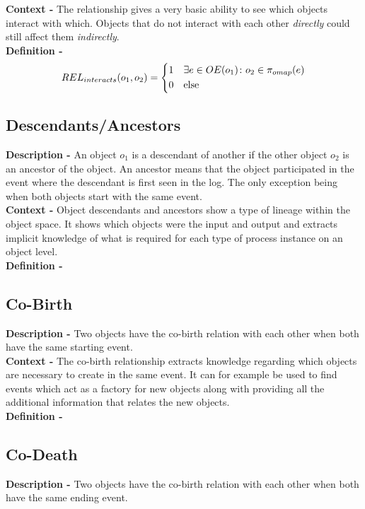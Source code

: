 \documentclass{article}
\begin{document}
\noindent\textbf{Context -} The relationship gives a very basic ability to see which objects interact with which. Objects that do not interact with each other \emph{directly} could still affect them \emph{indirectly}. \\

\noindent\textbf{Definition -}
\begin{equation}
	REL_{interacts}(o_1, o_2) =
	\begin{cases*}
		1 & $\exists e \in OE(o_1) \colon o_2 \in \pi_{omap}(e)$\\
		0 & else
	\end{cases*}
\end{equation}
\subsection{Descendants/Ancestors}
\noindent\textbf{Description -} An object $o_1$ is a descendant of another if the other object $o_2$ is an ancestor of the object. An ancestor means that the object participated in the event where the descendant is first seen in the log. The only exception being when both objects start with the same event. \\

\noindent\textbf{Context -} Object descendants and ancestors show a type of lineage within the object space. It shows which objects were the input and output and extracts implicit knowledge of what is required for each type of process instance on an object level. \\

\noindent\textbf{Definition -}
\subsection{Co-Birth}
\noindent\textbf{Description -} Two objects have the co-birth relation with each other when both have the same starting event. \\

\noindent\textbf{Context -} The co-birth relationship extracts knowledge regarding which objects are necessary to create in the same event. It can for example be used to find events which act as a factory for new objects along with providing all the additional information that relates the new objects.\\


\noindent\textbf{Definition -}
\subsection{Co-Death}
\noindent\textbf{Description -} Two objects have the co-birth relation with each other when both have the same ending event. \\
\end{document}
